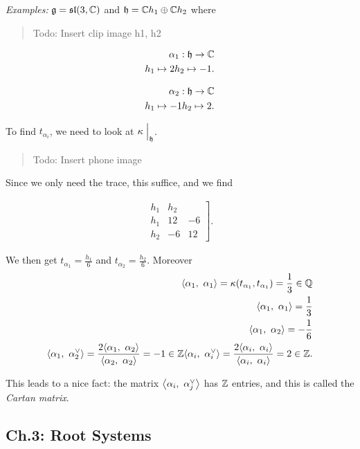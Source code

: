 \emph{Examples:} \({\mathfrak{g}} = {\mathfrak{sl}}(3, {\mathbb{C}})\) and
\({\mathfrak{h}} = {\mathbb{C}} h_1 \oplus {\mathbb{C}} h_2\) where

\begin{quote}
Todo: Insert clip image h1, h2
\end{quote}

\begin{align*}
\alpha_1: {\mathfrak{h}} \to {\mathbb{C}} \\
h_1 \mapsto 2
h_2 \mapsto -1
.\end{align*}

\begin{align*}
\alpha_2: {\mathfrak{h}} \to {\mathbb{C}} \\
h_1 \mapsto -1
h_2 \mapsto 2
.\end{align*}

To find \(t_{\alpha_i}\), we need to look at \(\kappa\mathrel{\Big|}_{\mathfrak{h}}\).

\begin{quote}
Todo: Insert phone image
\end{quote}

Since we only need the trace, this suffice, and we find

\begin{align*}
\left.\begin{array}{c|cc}{h_{1}} & {h_{2}} \\ {h_{1}} & {12} & {-6} \\ {h_{2}} & {-6} & {12}\end{array}\right]
.\end{align*}

We then get \(t_{\alpha_1} = \frac{h_1}{6}\) and
\(t_{\alpha_2} = \frac{h_2}{6}\). Moreover \begin{align*}
{\left\langle {\alpha_1},~{\alpha_1} \right\rangle} = \kappa(t_{\alpha_1}, t_{\alpha_1}) = \frac 1 3 \in {\mathbb{Q}} \\
{\left\langle {\alpha_1},~{\alpha_1} \right\rangle} = \frac 1 3 \\ 
{\left\langle {\alpha_1},~{\alpha_2} \right\rangle} = - \frac 1 6 \\
{\left\langle {\alpha_1},~{\alpha_2^\vee} \right\rangle} = \frac{2{\left\langle {\alpha_1},~{\alpha_2} \right\rangle}}{{\left\langle {\alpha_2},~{\alpha_2} \right\rangle}} = -1 \in {\mathbb{Z}}
{\left\langle {\alpha_i},~{\alpha_i^\vee} \right\rangle} = \frac{2{\left\langle {\alpha_i},~{\alpha_i} \right\rangle}}{{\left\langle {\alpha_i},~{\alpha_i} \right\rangle}} = 2 \in {\mathbb{Z}}
.\end{align*}

This leads to a nice fact: the matrix
\({\left\langle {\alpha_i},~{\alpha_j^\vee} \right\rangle}\) has \({\mathbb{Z}}\) entries, and this is
called the \emph{Cartan matrix}.

\hypertarget{ch.3-root-systems}{%
\subsection{Ch.3: Root Systems}\label{ch.3-root-systems}}

